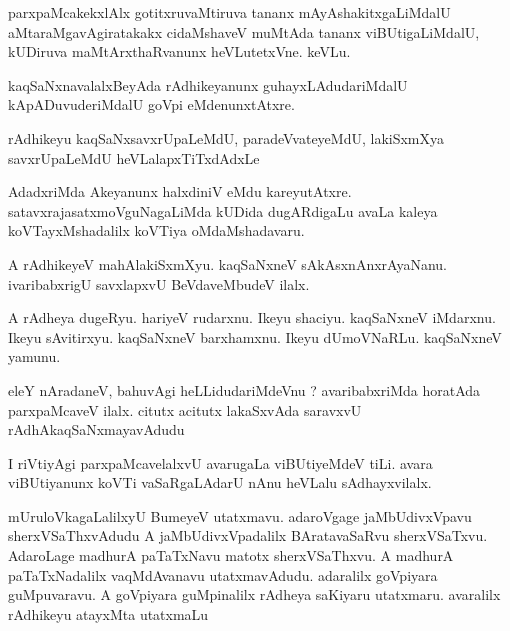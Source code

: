 \documentclass{article}
\begin{document}
\begin{mn}%
parxpaMcakekxlAlx gotitxruvaMtiruva tananx mAyAshakitxgaLiMdalU aMtaraMgavAgiratakakx 
cidaMshaveV muMtAda tananx viBUtigaLiMdalU, kUDiruva maMtArxthaRvanunx heVLutetxVne. keVLu.
\end{mn}

\begin{mn}%
kaqSaNxnavalalxBeyAda rAdhikeyanunx guhayxLAdudariMdalU kApADuvuderiMdalU goVpi 
eMdenunxtAtxre.
\end{mn}

\begin{mn}%
rAdhikeyu kaqSaNxsavxrUpaLeMdU, paradeVvateyeMdU, lakiSxmXya savxrUpaLeMdU 
heVLalapxTiTxdAdxLe
\end{mn}

\begin{mn}%
AdadxriMda Akeyanunx halxdiniV eMdu kareyutAtxre. satavxrajasatxmoVguNagaLiMda kUDida 
dugARdigaLu avaLa kaleya koVTayxMshadalilx koVTiya oMdaMshadavaru.
\end{mn}

\begin{mn}%
A rAdhikeyeV mahAlakiSxmXyu. kaqSaNxneV sAkAsxnAnxrAyaNanu. ivaribabxrigU savxlapxvU 
BeVdaveMbudeV ilalx.
\end{mn}

\begin{mn}%
A rAdheya dugeRyu. hariyeV rudarxnu. Ikeyu shaciyu. kaqSaNxneV iMdarxnu. Ikeyu sAvitirxyu. 
kaqSaNxneV barxhamxnu. Ikeyu dUmoVNaRLu. kaqSaNxneV yamunu.
\end{mn}

\begin{mn}%
eleY nAradaneV, bahuvAgi heLLidudariMdeVnu ? avaribabxriMda horatAda parxpaMcaveV ilalx. 
citutx acitutx lakaSxvAda saravxvU rAdhAkaqSaNxmayavAdudu
\end{mn}

\begin{mn}%
I riVtiyAgi parxpaMcavelalxvU avarugaLa viBUtiyeMdeV tiLi. avara viBUtiyanunx koVTi 
vaSaRgaLAdarU nAnu heVLalu sAdhayxvilalx.
\end{mn}

\begin{mn}%
mUruloVkagaLalilxyU BumeyeV utatxmavu. adaroVgage jaMbUdivxVpavu sherxVSaThxvAdudu A 
jaMbUdivxVpadalilx BAratavaSaRvu sherxVSaTxvu. AdaroLage madhurA paTaTxNavu matotx 
sherxVSaThxvu. A madhurA paTaTxNadalilx vaqMdAvanavu utatxmavAdudu. adaralilx goVpiyara  
guMpuvaravu. A goVpiyara guMpinalilx rAdheya saKiyaru utatxmaru. avaralilx  rAdhikeyu 
atayxMta utatxmaLu
\end{mn}
\end{document}
